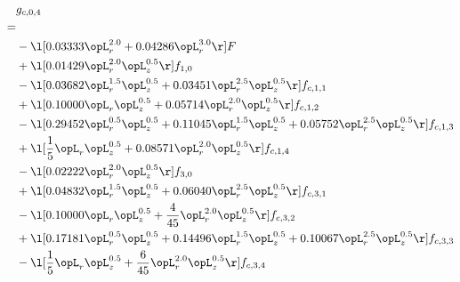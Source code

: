 \begin{alignat}{2} 
\label{eq:g_04_0} 
& g_{c,0,4} \nonumber \\ 
 = \\ 
& - \l[  0.03333 \opL_r^{2.0} +  0.04286 \opL_r^{3.0}  \r] F \nonumber \\ 
& + \l[  0.01429 \opL_r^{2.0} \opL_z^{0.5}  \r] f_{1,0} \nonumber \\ 
& - \l[  0.03682 \opL_r^{1.5} \opL_z^{0.5} +  0.03451 \opL_r^{2.5} \opL_z^{0.5}  \r] f_{c,1,1} \nonumber \\ 
& + \l[  0.10000 \opL_r \opL_z^{0.5} +  0.05714 \opL_r^{2.0} \opL_z^{0.5}  \r] f_{c,1,2} \nonumber \\ 
& - \l[  0.29452 \opL_r^{0.5} \opL_z^{0.5} +  0.11045 \opL_r^{1.5} \opL_z^{0.5} +  0.05752 \opL_r^{2.5} \opL_z^{0.5}  \r] f_{c,1,3} \nonumber \\ 
& + \l[ \frac{1}{5} \opL_r \opL_z^{0.5} +  0.08571 \opL_r^{2.0} \opL_z^{0.5}  \r] f_{c,1,4} \nonumber \\ 
& - \l[  0.02222 \opL_r^{2.0} \opL_z^{0.5}  \r] f_{3,0} \nonumber \\ 
& + \l[  0.04832 \opL_r^{1.5} \opL_z^{0.5} +  0.06040 \opL_r^{2.5} \opL_z^{0.5}  \r] f_{c,3,1} \nonumber \\ 
& - \l[  0.10000 \opL_r \opL_z^{0.5} + \frac{4}{45} \opL_r^{2.0} \opL_z^{0.5}  \r] f_{c,3,2} \nonumber \\ 
& + \l[  0.17181 \opL_r^{0.5} \opL_z^{0.5} +  0.14496 \opL_r^{1.5} \opL_z^{0.5} +  0.10067 \opL_r^{2.5} \opL_z^{0.5}  \r] f_{c,3,3} \nonumber \\ 
& - \l[ \frac{1}{5} \opL_r \opL_z^{0.5} + \frac{6}{45} \opL_r^{2.0} \opL_z^{0.5}  \r] f_{c,3,4} \nonumber \\ 
\end{alignat} 


